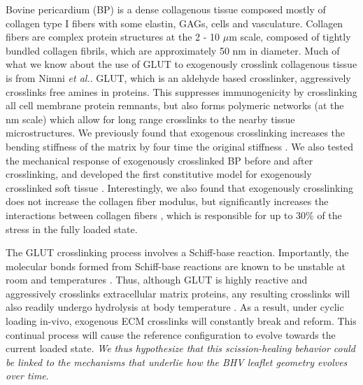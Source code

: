 	Bovine pericardium (BP) is a dense collagenous tissue composed mostly of collagen type I fibers with some elastin, GAGs, cells and vasculature. Collagen fibers are complex protein structures at the 2 - 10 $\mu$m scale, composed of tightly bundled collagen fibrils, which are approximately 50 nm in diameter. Much of what we know about the use of GLUT to exogenously crosslink collagenous tissue is from Nimni \textit{et al.}\cite{cheung_mechanism_1990, nimni_chemically_1987, cheung_mechanism_1985, gendler_toxic_1984, cheung_presence_1983, cheung_mechanism_1982, cheung_mechanism_1982II}. GLUT, which is an aldehyde based crosslinker, aggressively crosslinks free amines in proteins. This suppresses immunogenicity by crosslinking all cell membrane protein remnants, but also forms polymeric networks (at the nm scale) which allow for long range crosslinks to the nearby tissue microstructures. We previously found that exogenous crosslinking increases the bending stiffness of the matrix by four time the original stiffness \cite{mirnajafi_effects_2010}. We also tested the mechanical response of exogenously crosslinked BP before and after crosslinking, and developed the first constitutive model for exogenously crosslinked soft tissue \cite{sacks_novel_2016}. Interestingly, we also found that exogenously crosslinking does not increase the collagen fiber modulus, but significantly increases the interactions between collagen fibers \cite{sacks_novel_2016}, which is responsible for up to 30\% of the stress in the fully loaded state. 


	The GLUT crosslinking process involves a Schiff-base reaction. Importantly, the molecular bonds formed from Schiff-base reactions are known to be unstable at room and temperatures \cite{migneault_glutaraldehyde_2004, damink_glutaraldehyde_1995}. Thus, although GLUT is highly reactive and aggressively crosslinks extracellular matrix proteins, any resulting crosslinks will also readily undergo hydrolysis at body temperature \cite{migneault_glutaraldehyde_2004}. As a result, under cyclic loading in-vivo, exogenous ECM crosslinks will constantly break and reform. This continual process will cause the reference configuration to evolve towards the current loaded state. \emph{We thus hypothesize that this scission-healing behavior could be linked to the mechanisms that underlie how the BHV leaflet geometry evolves over time}.
	
